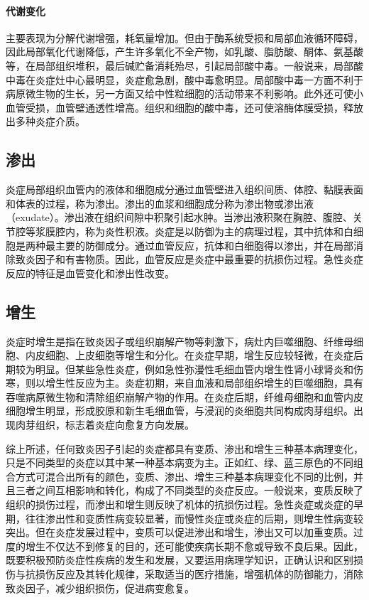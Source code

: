 \paragraph{代谢变化}
主要表现为分解代谢增强，耗氧量增加。但由于酶系统受损和局部血液循环障碍，因此局部氧化代谢降低，产生许多氧化不全产物，如乳酸、脂肪酸、酮体、氨基酸等，在局部组织堆积，最后碱贮备消耗殆尽，引起局部酸中毒。一般说来，局部酸中毒在炎症灶中心最明显，炎症愈急剧，酸中毒愈明显。局部酸中毒一方面不利于病原微生物的生长，另一方面又给中性粒细胞的活动带来不利影响。此外还可使小血管受损，血管壁通透性增高。组织和细胞的酸中毒，还可使溶酶体膜受损，释放出多种炎症介质。

\subsection{渗出}

炎症局部组织血管内的液体和细胞成分通过血管壁进入组织间质、体腔、黏膜表面和体表的过程，称为渗出。渗出的血浆和细胞成分称为渗出物或渗出液（exudate）。渗出液在组织间隙中积聚引起水肿。当渗出液积聚在胸腔、腹腔、关节腔等浆膜腔内，称为炎性积液。炎症是以防御为主的病理过程，其中抗体和白细胞是两种最主要的防御成分。通过血管反应，抗体和白细胞得以渗出，并在局部消除致炎因子和有害物质。因此，血管反应是炎症中最重要的抗损伤过程。急性炎症反应的特征是血管变化和渗出性改变。

\subsection{增生}

炎症时增生是指在致炎因子或组织崩解产物等刺激下，病灶内巨噬细胞、纤维母细胞、内皮细胞、上皮细胞等增生和分化。在炎症早期，增生反应较轻微，在炎症后期较为明显。但某些急性炎症，例如急性弥漫性毛细血管内增生性肾小球肾炎和伤寒，则以增生性反应为主。炎症初期，来自血液和局部组织增生的巨噬细胞，具有吞噬病原微生物和清除组织崩解产物的作用。在炎症后期，纤维母细胞和血管内皮细胞增生明显，形成胶原和新生毛细血管，与浸润的炎细胞共同构成肉芽组织。出现肉芽组织，标志着炎症向愈复方向发展。

综上所述，任何致炎因子引起的炎症都具有变质、渗出和增生三种基本病理变化，只是不同类型的炎症以其中某一种基本病变为主。正如红、绿、蓝三原色的不同组合方式可混合出所有的颜色，变质、渗出、增生三种基本病理变化不同的比例，并且三者之间互相影响和转化，构成了不同类型的炎症反应。一般说来，变质反映了组织的损伤过程，而渗出和增生则反映了机体的抗损伤过程。急性炎症或炎症的早期，往往渗出性和变质性病变较显著，而慢性炎症或炎症的后期，则增生性病变较突出。但在炎症发展过程中，变质可以促进渗出和增生，渗出又可以加重变质。过度的增生不仅达不到修复的目的，还可能使疾病长期不愈或导致不良后果。因此，既要积极预防炎症性疾病的发生和发展，又要运用病理学知识，正确认识和区别损伤与抗损伤反应及其转化规律，采取适当的医疗措施，增强机体的防御能力，消除致炎因子，减少组织损伤，促进病变愈复。

